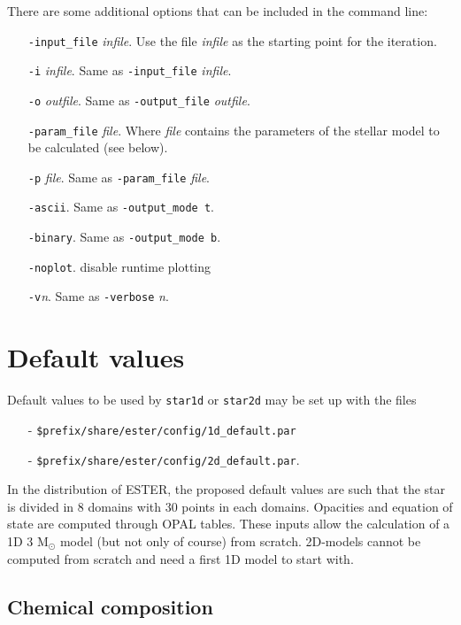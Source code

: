 \bigskip
There are some additional options that can be included in the command line:

\begin{itemize}
\item[] {\tt -input\_file} {\it infile}. Use the file {\it infile} as the starting point
for the iteration.
\item[] {\tt -i} {\it infile}. Same as {\tt -input\_file} {\it infile}.
\item[] {\tt -o} {\it outfile}. Same as {\tt -output\_file} {\it outfile}.
\item[] {\tt -param\_file} {\it file}. Where {\it file} contains the parameters of the 
stellar model to be calculated (see below).
\item[] {\tt -p} {\it file}. Same as {\tt -param\_file} {\it file}.
\item[] {\tt -ascii}. Same as {\tt -output\_mode t}.
\item[] {\tt -binary}. Same as {\tt -output\_mode b}.
\item[] {\tt -noplot}. disable runtime plotting %
\item[] {\tt -v}{\it n}. Same as {\tt -verbose} {\it n}.
\end{itemize}

\section{Default values}

Default values to be used by {\tt star1d} or {\tt star2d} may be set up
with the files 
\begin{itemize}
\item[-]{\tt \$prefix/share/ester/config/1d\_default.par} 
\item[-]{\tt \$prefix/share/ester/config/2d\_default.par}.
\end{itemize}

In the distribution of ESTER, the proposed default values are such that
the star is divided in 8 domains with 30 points in each domains. Opacities
and equation of state are computed through OPAL tables. These inputs
allow the calculation of a 1D 3 M$_\odot$ model (but not only of course)
from scratch. 2D-models cannot be computed from scratch and need a first
1D model to start with.

\subsection{Chemical composition}

